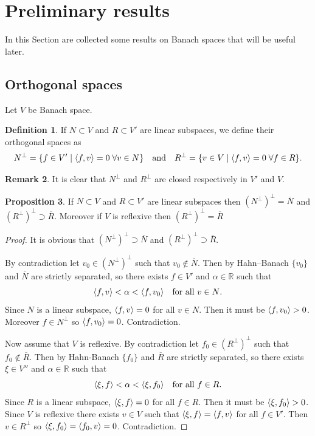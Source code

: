 \documentclass[a4paper,11pt]{article}
\theoremstyle{definition}
\newtheorem{prop}{Proposition}
\newtheorem{defi}[prop]{Definition}
\newtheorem{rmk}[prop]{Remark}
\DeclarePairedDelimiter{\dual}{\langle}{\rangle}
\begin{document}
\section{Preliminary results}

In this Section are collected some results on Banach spaces that will be useful later.

\subsection{Orthogonal spaces}

Let $V$ be Banach space.

\begin{defi}
If $N\subset V$ and $R\subset V'$ are linear subspaces, we define their orthogonal spaces as
\[
N^\perp=\{f\in V'\;|\;\dual{f,v}=0\;\forall v\in N\}
\quad\text{and}\quad
R^\perp=\{v\in V\;|\;\dual{f,v}=0\;\forall f\in R\}.
\]
\end{defi}
\begin{rmk}
It is clear that $N^\perp$ and $R^\perp$ are closed respectively in $V'$ and $V$.
\end{rmk}

\begin{prop}
\label{prop:double-orth}
If $N\subset V$ and $R\subset V'$ are linear subspaces then $(N^\perp)^\perp=\overline{N}$ and $(R^\perp)^\perp\supset\overline{R}$. Moreover if $V$ is reflexive then $(R^\perp)^\perp=\overline{R}$
\end{prop}
\begin{proof}
It is obvious that $(N^\perp)^\perp\supset\overline{N}$ and $(R^\perp)^\perp\supset\overline{R}$.

By contradiction let $v_0\in(N^\perp)^\perp$ such that $v_0\notin\overline{N}$. Then by Hahn--Banach $\{v_0\}$ and $\overline{N}$ are strictly separated, so there exists $f\in V'$ and $\alpha\in\mathbb{R}$ such that
\[
\dual{f,v}<\alpha<\dual{f,v_0}\quad\text{for all $v\in N$}.
\]
Since $N$ is a linear subspace, $\dual{f,v}=0$ for all $v\in N$. Then it must be $\dual{f,v_0}>0$. Moreover $f\in N^\perp$ so $\dual{f,v_0}=0$. Contradiction.

Now assume that $V$ is reflexive. By contradiction let $f_0\in(R^\perp)^\perp$ such that $f_0\notin\overline{R}$. Then by Hahn-Banach $\{f_0\}$ and $\overline{R}$ are strictly separated, so there exists $\xi\in V''$ and $\alpha\in\mathbb{R}$ such that
\[
\dual{\xi,f}<\alpha<\dual{\xi,f_0}\quad\text{for all $f\in R$}.
\]
Since $R$ is a linear subspace, $\dual{\xi,f}=0$ for all $f\in R$. Then it must be $\dual{\xi,f_0}>0$. Since $V$ is reflexive there exists $v\in V$ such that $\dual{\xi,f}=\dual{f,v}$ for all $f\in V'$. Then $v\in R^\perp$ so $\dual{\xi,f_0}=\dual{f_0,v}=0$. Contradiction.
\end{proof}
\end{document}
